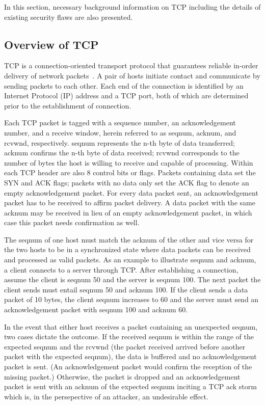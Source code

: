 \documentclass{sig-alternate}
\begin{document}
In this section, necessary background information on TCP including the details of existing security flaws are also presented.

\subsection{Overview of TCP}

TCP is a connection-oriented transport protocol that guarantees reliable in-order delivery of network packets~\cite{rfc:tcp}. A pair of hosts initiate contact and communicate by sending packets to each other.
Each end of the connection is identified by an Internet Protocol (IP) address and a TCP port, both of which are determined prior to the establishment of connection.

Each TCP packet is tagged with a sequence number, an acknowledgement number, and a receive window, herein referred to as seqnum, acknum, and rcvwnd, respectively. seqnum represents the n-th byte of data transferred; acknum confirms the n-th byte of data received; rcvwnd corresponds to the number of bytes the host is willing to receive and capable of processing. Within each TCP header are also 8 control bits or flags. Packets containing data set the SYN and ACK flags; packets with no data only set the ACK flag to denote an empty acknowledgement packet. For every data packet sent, an acknowledgement packet has to be received to affirm packet delivery. A data packet with the same acknum may be received in lieu of an empty acknowledgement packet, in which case this packet needs confirmation as well.

The seqnum of one host must match the acknum of the other and vice versa for the two hosts to be in a synchronized state where data packets can be received and processed as valid packets. As an example to illustrate seqnum and acknum, a client connects to a server through TCP. After establishing a connection, assume the client is seqnum 50 and the server is seqnum 100. The next packet the client sends must entail seqnum 50 and acknum 100. If the client sends a data packet of 10 bytes, the client seqnum increases to 60 and the server must send an acknowledgement packet with seqnum 100 and acknum 60.

In the event that either host receives a packet containing an unexpected seqnum, two cases dictate the outcome. If the received seqnum is within the range of the expected seqnum and the rcvwnd (the packet received arrived before another packet with the expected seqnum), the data is buffered and no acknowledgement packet is sent. (An acknowledgement packet would confirm the reception of the missing packet.) Otherwise, the packet is dropped and an acknowledgement packet is sent with an acknum of the expected seqnum inciting a TCP ack storm~\cite{anderson:ackstorm} which is, in the persepective of an attacker, an undesirable effect.
\end{document}
